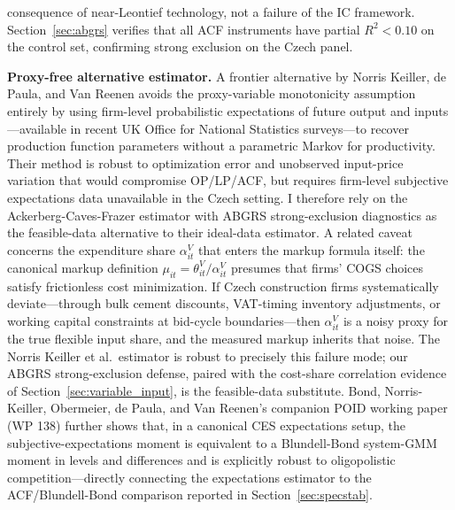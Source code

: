 \documentclass[11pt]{article}
\begin{document}
consequence of near-Leontief technology, not a failure of the IC framework. Section~\ref{sec:abgrs} verifies that all ACF instruments have partial $R^2 < 0.10$ on the control set, confirming strong exclusion on the Czech panel.

\textbf{Proxy-free alternative estimator.} A frontier alternative by Norris Keiller, de Paula, and Van Reenen \cite{NorrisKeillerdePaulaVanReenen2024} avoids the proxy-variable monotonicity assumption entirely by using firm-level probabilistic expectations of future output and inputs---available in recent UK Office for National Statistics surveys---to recover production function parameters without a parametric Markov for productivity. Their method is robust to optimization error and unobserved input-price variation that would compromise OP/LP/ACF, but requires firm-level subjective expectations data unavailable in the Czech setting. I therefore rely on the Ackerberg-Caves-Frazer estimator with ABGRS strong-exclusion diagnostics as the feasible-data alternative to their ideal-data estimator. A related caveat concerns the expenditure share $\alpha^V_{it}$ that enters the markup formula itself: the canonical markup definition $\mu_{it} = \theta^V_{it}/\alpha^V_{it}$ presumes that firms' COGS choices satisfy frictionless cost minimization. If Czech construction firms systematically deviate---through bulk cement discounts, VAT-timing inventory adjustments, or working capital constraints at bid-cycle boundaries---then $\alpha^V_{it}$ is a noisy proxy for the true flexible input share, and the measured markup inherits that noise. The Norris Keiller et al.\ estimator is robust to precisely this failure mode; our ABGRS strong-exclusion defense, paired with the cost-share correlation evidence of Section~\ref{sec:variable_input}, is the feasible-data substitute. Bond, Norris-Keiller, Obermeier, de Paula, and Van Reenen's \cite{BondEtAl2026POID} companion POID working paper (WP 138) further shows that, in a canonical CES expectations setup, the subjective-expectations moment is equivalent to a Blundell-Bond \cite{BlundellBond1998} system-GMM moment in levels and differences and is explicitly robust to oligopolistic competition---directly connecting the expectations estimator to the ACF/Blundell-Bond comparison reported in Section~\ref{sec:specstab}.
\end{document}
